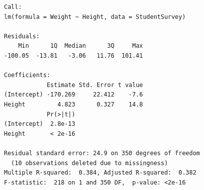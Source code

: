 \documentclass[10pt]{report}\usepackage[]{graphicx}\usepackage[]{xcolor}
\makeatletter
\newenvironment{kframe}{%
 \def\at@end@of@kframe{}%
 \ifinner\ifhmode%
  \def\at@end@of@kframe{\end{minipage}}%
  \begin{minipage}{\columnwidth}%
 \fi\fi%
 \def\FrameCommand##1{\hskip\@totalleftmargin \hskip-\fboxsep
 \colorbox{shadecolor}{##1}\hskip-\fboxsep
     \hskip-\linewidth \hskip-\@totalleftmargin \hskip\columnwidth}%
 \MakeFramed {\advance\hsize-\width
   \@totalleftmargin\z@ \linewidth\hsize
   \@setminipage}}%
 {\par\unskip\endMakeFramed%
 \at@end@of@kframe}
\newenvironment{knitrout}{}{} %
\makeatother
\begin{document}
\begin{multicols}{2}
\begin{knitrout}
\begin{kframe}
\begin{verbatim}
Call:
lm(formula = Weight ~ Height, data = StudentSurvey)

Residuals:
    Min      1Q  Median      3Q     Max 
-100.05  -13.81   -3.06   11.76  101.41 

Coefficients:
            Estimate Std. Error t value
(Intercept) -170.269     22.412    -7.6
Height         4.823      0.327    14.8
            Pr(>|t|)
(Intercept)  2.8e-13
Height       < 2e-16

Residual standard error: 24.9 on 350 degrees of freedom
  (10 observations deleted due to missingness)
Multiple R-squared:  0.384,	Adjusted R-squared:  0.382 
F-statistic:  218 on 1 and 350 DF,  p-value: <2e-16
\end{verbatim}
\end{kframe}
\end{knitrout}


\end{multicols}
\end{document}
